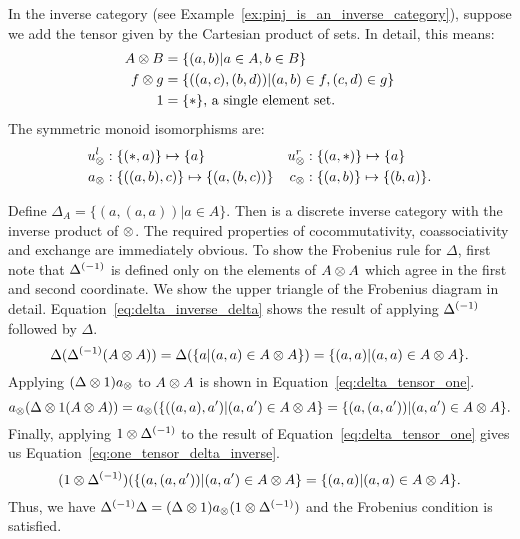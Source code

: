 \begin{example}\label{ex:pinj_is_a_discrete_inverse_category}
  In the inverse category \pinj (see Example~\ref{ex:pinj_is_an_inverse_category}), suppose we add
  the tensor given by the Cartesian product of sets. In detail, this means:
  \begin{align*}
    A \otimes B &= \{(a,b)| a\in A, b\in B\}\\
    f \otimes g &= \{((a,c),(b,d)) | (a,b) \in f, (c,d) \in g\}\\
    1 & = \{*\}\text{, a single element set.}
  \end{align*}
  The symmetric monoid isomorphisms are:
    \begin{align*}
      u_{\otimes}^l &: \{(*,a)\} \mapsto \{a\}
      &u_{\otimes}^r &: \{(a,*)\} \mapsto \{a\}\\
      a_{\otimes} &: \{((a,b),c)\} \mapsto \{(a,(b,c))\}
      &c_{\otimes} &: \{(a,b)\} \mapsto \{(b,a)\}.
    \end{align*}

  Define $\Delta_A = \{(a,(a,a)) | a\in A\}$. Then \pinj is a discrete inverse category with the
  inverse product of $\otimes$. The required properties of cocommutativity, coassociativity and
  exchange are immediately obvious. To show the Frobenius rule for $\Delta$, first note that
  ${\Delta}^{(-1)}$ is defined only on the elements of $A\otimes A$ which agree in the first and second
  coordinate. We show the upper triangle of the Frobenius diagram in
  detail. Equation~\ref{eq:delta_inverse_delta} shows the result of applying ${\Delta}^{(-1)}$ followed by
  $\Delta$.
  \begin{equation}
    \Delta({\Delta}^{(-1)}(A\otimes A)) = \Delta(\{a | (a,a) \in A\otimes A\})
    = \{(a,a) | (a,a) \in A\otimes A\}.\label{eq:delta_inverse_delta}
  \end{equation}
  Applying $(\Delta \otimes 1)a_{\otimes}$ to $A\otimes A$ is shown in Equation~\ref{eq:delta_tensor_one}.
  \begin{equation}
    a_{\otimes}(\Delta\otimes1(A\otimes A)) = a_{\otimes}(\{((a,a),a') | (a,a') \in A\otimes A\} = \{(a,(a,a')) | (a,a') \in
    A\otimes A\}.\label{eq:delta_tensor_one}
  \end{equation}
  Finally, applying $1 \otimes {\Delta}^{(-1)}$ to the result of Equation~\ref{eq:delta_tensor_one} gives us
  Equation~\ref{eq:one_tensor_delta_inverse}.
  \begin{equation}
    (1\otimes{\Delta}^{(-1)})(\{(a,(a,a')) | (a,a') \in  A\otimes A\} = \{(a,a) | (a,a) \in A\otimes A\} \label{eq:one_tensor_delta_inverse}.
  \end{equation}
  Thus, we have ${\Delta}^{(-1)}\Delta = (\Delta \otimes 1) a_{\otimes} (1\otimes{\Delta}^{(-1)})$ and the Frobenius
  condition is satisfied.
\end{example}

